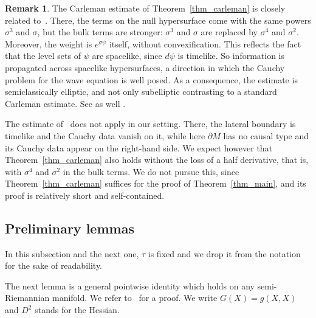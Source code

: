 \documentclass[12pt,reqno]{amsart}
\numberwithin{equation}{section}
\theoremstyle{definition}
\theoremstyle{plain}
\theoremstyle{definition}
\theoremstyle{definition}
\newtheorem{remark}[theorem]{Remark}
\newcommand{\uu}{M}
\begin{document}
\begin{remark}\label{rem_powers}
The Carleman estimate of Theorem~\ref{thm_carleman} is closely related to~\cite[Proposition~2.5]{oksanen2026semiglobaluniquenesslorentziancalderon}. There, the terms on the null hypersurface come with the same powers $\sigma^3$ and $\sigma$, but the bulk terms are stronger: $\sigma^3$ and $\sigma$ are replaced by $\sigma^4$ and $\sigma^2$. Moreover, the weight is $e^{\sigma\psi}$ itself, without convexification. This reflects the fact that the level sets of $\psi$ are spacelike, since $d\psi$ is timelike. So information is propagated across spacelike hypersurfaces, a direction in which the Cauchy problem for the wave equation is well posed. As a consequence, the estimate is semiclassically elliptic, and not only subelliptic contrasting to a standard Carleman estimate. See as well \cite[Remark~C.9]{oksanen2026semiglobaluniquenesslorentziancalderon}.

The estimate of~\cite[Proposition~2.5]{oksanen2026semiglobaluniquenesslorentziancalderon} does not apply in our setting. There, the lateral boundary is timelike and the Cauchy data vanish on it, while here $\partial\uu$ has no causal type and its Cauchy data appear on the right-hand side. We expect however that Theorem~\ref{thm_carleman} also holds without the loss of a half derivative, that is, with $\sigma^4$ and $\sigma^2$ in the bulk terms. We do not pursue this, since Theorem~\ref{thm_carleman} suffices for the proof of Theorem~\ref{thm_main}, and its proof is relatively short and self-contained.
\end{remark}

\subsection{Preliminary lemmas}

In this subsection and the next one, $\tau$ is fixed and we drop it from the notation for the sake of readability.

The next lemma is a general pointwise identity which holds on any semi-Riemannian manifold. We refer to~\cite[Lemma 2.1]{FO25explicit} for a proof. We write $G(X)=g(X,X)$ and $D^2$ stands for the Hessian.
\end{document}
